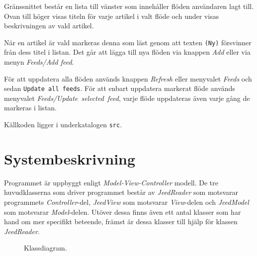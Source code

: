 \documentclass[titlepage, twoside, a4paper, 12pt]{article}
\begin{document}
Gränssnittet består en lista till vänster som innehåller flöden
användaren lagt till. Ovan till höger visas titeln för varje artikel i
valt flöde och under visas beskrivningen av vald artikel.

När en artikel är vald markeras denna som läst genom att texten
\verb!(Ny)! försvinner från dess titel i listan. Det går att lägga
till nya flöden via knappen \textit{Add} eller via menyn
\textit{Feeds/Add feed}.

För att uppdatera alla flöden används knappen \textit{Refresh} eller
menyvalet \textit{Feeds} och sedan \texttt{Update~all~feeds}. För att
enbart uppdatera markerat flöde används menyvalet
\textit{Feeds/Update~selected~feed}, varje flöde uppdateras även varje
gång de markeras i listan.

Källkoden ligger i underkatalogen \verb!src!.

\section{Systembeskrivning}\label{Systembeskrivning}
Programmet är uppbyggt enligt \textit{Model-View-Controller}
modell. De tre huvudklasserna som driver programmet består av
\textit{JeedReader} som motsvarar programmets \textit{Controller}-del,
\textit{JeedView} som motsvarar \textit{View}-delen och
\textit{JeedModel} som motsvarar \textit{Model}-delen. Utöver dessa
finns även ett antal klasser som har hand om mer specifikt beteende,
främst är dessa klasser till hjälp för klassen \textit{JeedReader}.

\newpage
\begin{figure}[H]
  \begin{center}
    \caption{Klassdiagram.}
    \label{fig:classUML}
  \end{center}
\end{figure}
\end{document}
